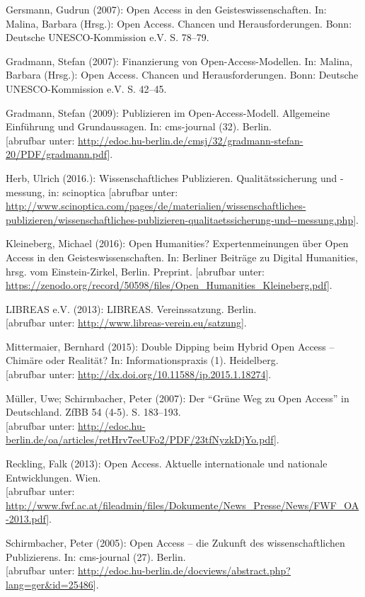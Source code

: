 \documentclass[a4paper,
fontsize=11pt,
oneside,
numbers=noperiodatend,
parskip=half-,
bibliography=totoc,
final
]{scrartcl}
\begin{document}
Gersmann, Gudrun (2007): Open Access in den Geisteswissenschaften. In:
Malina, Barbara (Hrsg.): Open Access. Chancen und Herausforderungen.
Bonn: Deutsche UNESCO-Kommission e.V. S. 78--79.

Gradmann, Stefan (2007): Finanzierung von Open-Access-Modellen. In:
Malina, Barbara (Hrsg.): Open Access. Chancen und Herausforderungen.
Bonn: Deutsche UNESCO-Kommission e.V. S. 42--45.

Gradmann, Stefan (2009): Publizieren im Open-Access-Modell. Allgemeine
Einführung und Grundaussagen. In: cms-journal (32). Berlin.\\
{[}abrufbar unter:
\url{http://edoc.hu-berlin.de/cmsj/32/gradmann-stefan-20/PDF/gradmann.pdf}{]}.

Herb, Ulrich (2016.): Wissenschaftliches Publizieren. Qualitätssicherung
und -messung, in: scinoptica {[}abrufbar unter:
\url{http://www.scinoptica.com/pages/de/materialien/wissenschaftliches-publizieren/wissenschaftliches-publizieren-qualitaetssicherung-und--messung.php}{]}.

Kleineberg, Michael (2016): Open Humanities? Expertenmeinungen über Open
Access in den Geisteswissenschaften. In: Berliner Beiträge zu Digital
Humanities, hrsg. vom Einstein-Zirkel, Berlin. Preprint. {[}abrufbar
unter:
\url{https://zenodo.org/record/50598/files/Open_Humanities_Kleineberg.pdf}{]}.

LIBREAS e.V. (2013): LIBREAS. Vereinssatzung. Berlin.\\
{[}abrufbar unter: \url{http://www.libreas-verein.eu/satzung}{]}.

Mittermaier, Bernhard (2015): Double Dipping beim Hybrid Open Access --
Chimäre oder Realität? In: Informationspraxis (1). Heidelberg.\\
{[}abrufbar unter: \url{http://dx.doi.org/10.11588/ip.2015.1.18274}{]}.

Müller, Uwe; Schirmbacher, Peter (2007): Der \enquote{Grüne Weg zu Open
Access} in Deutschland. ZfBB 54 (4-5). S. 183--193.\\
{[}abrufbar unter:
\url{http://edoc.hu-berlin.de/oa/articles/retHrv7eeUFo2/PDF/23tfNyzkDjYo.pdf}{]}.

Reckling, Falk (2013): Open Access. Aktuelle internationale und
nationale Entwicklungen. Wien.\\
{[}abrufbar unter:
\url{http://www.fwf.ac.at/fileadmin/files/Dokumente/News_Presse/News/FWF_OA-2013.pdf}{]}.

Schirmbacher, Peter (2005): Open Access -- die Zukunft des
wissenschaftlichen Publizierens. In: cms-journal (27). Berlin.\\
{[}abrufbar unter:
\url{http://edoc.hu-berlin.de/docviews/abstract.php?lang=ger\&id=25486}{]}.
\end{document}
